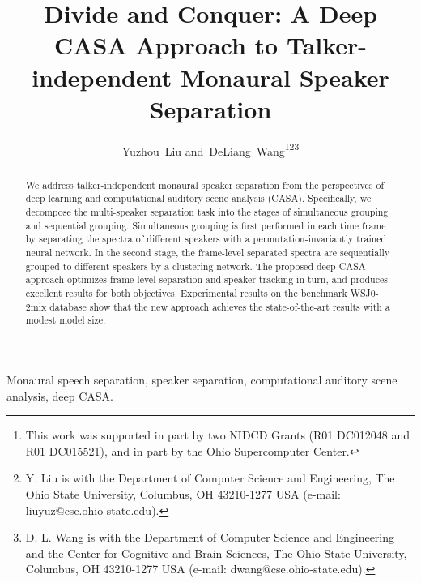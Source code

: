 \documentclass[journal]{IEEEtran}
\begin{document}
\title{Divide and Conquer: A Deep CASA Approach to Talker-independent Monaural Speaker Separation}


\author{Yuzhou~Liu 
        and~DeLiang~Wang\thanks{This work was supported in part by two NIDCD Grants (R01 DC012048 and R01 DC015521), and in part by the Ohio Supercomputer Center.}\thanks{Y. Liu is with the Department of Computer Science and Engineering, The Ohio State University, Columbus, OH 43210-1277 USA (e-mail: liuyuz@cse.ohio-state.edu).}\thanks{
D. L. Wang is with the Department of Computer Science and Engineering and the Center for Cognitive and Brain Sciences, The Ohio State University, Columbus, OH 43210-1277 USA (e-mail: dwang@cse.ohio-state.edu).
}}


















\maketitle

\begin{abstract}


We address talker-independent monaural speaker separation from the perspectives of deep learning and computational auditory scene analysis (CASA).
Specifically, we decompose the multi-speaker separation task into the stages of simultaneous grouping and sequential grouping. 
Simultaneous grouping is first performed in each time frame by separating the spectra of different speakers with a permutation-invariantly trained neural network.
In the second stage, the frame-level separated spectra are sequentially grouped to different speakers by a clustering network.
The proposed deep CASA approach optimizes frame-level separation and speaker tracking in turn, and produces excellent results for both objectives.
Experimental results on the benchmark WSJ0-2mix database show that the new approach achieves the state-of-the-art results with a modest model size.

  \end{abstract}

\begin{IEEEkeywords}
Monaural speech separation, speaker separation, computational auditory scene analysis, deep CASA.\end{IEEEkeywords}
\end{document}
